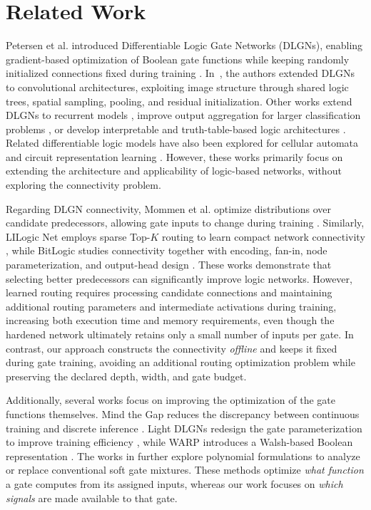 \section{Related Work}


Petersen et al. introduced Differentiable Logic Gate Networks (DLGNs),
enabling gradient-based optimization of Boolean gate functions while
keeping randomly initialized connections fixed during training
\cite{petersen2022}. In~\cite{petersen2024}, the authors extended DLGNs
to convolutional architectures, exploiting image structure through shared
logic trees, spatial sampling, pooling, and residual initialization. Other
works extend DLGNs to recurrent models \cite{buehrer2025recurrent},
improve output aggregation for larger classification problems
\cite{brandle2025}, or develop interpretable and truth-table-based logic
architectures \cite{yue2024,benamira2022,benamira2024}. Related
differentiable logic models have also been explored for cellular automata
\cite{mordvintsev2020,miotti2025} and circuit representation learning
\cite{li2022deepgate}. However, these works primarily focus on extending
the architecture and applicability of logic-based networks, without exploring the connectivity problem.


Regarding DLGN connectivity, Mommen et al. optimize distributions over
candidate predecessors, allowing gate inputs to change during training
\cite{mommen2025}. Similarly, LILogic Net employs sparse Top-$K$ routing
to learn compact network connectivity \cite{fojcik2026}, while BitLogic
studies connectivity together with encoding, fan-in, node
parameterization, and output-head design \cite{buehrer2026}. These works
demonstrate that selecting better predecessors can significantly improve
logic networks. However, learned routing requires processing candidate
connections and maintaining additional routing parameters and
intermediate activations during training, increasing both execution time
and memory requirements, even though the hardened network ultimately
retains only a small number of inputs per gate. In contrast, our approach
constructs the connectivity \emph{offline} and keeps it fixed during gate
training, avoiding an additional routing optimization problem while
preserving the declared depth, width, and gate budget.


Additionally, several works focus on improving the optimization of the
gate functions themselves. Mind the Gap reduces the discrepancy between
continuous training and discrete inference \cite{yousefi2025}. Light
DLGNs redesign the gate parameterization to improve training efficiency
\cite{ruttgers2025}, while WARP introduces a Walsh-based Boolean
representation \cite{gerlach2026}. The works in
\cite{kim2026,damera2026} further explore polynomial formulations to
analyze or replace conventional soft gate mixtures. These methods
optimize \emph{what function} a gate computes from its assigned inputs,
whereas our work focuses on \emph{which signals} are made available to
that gate.